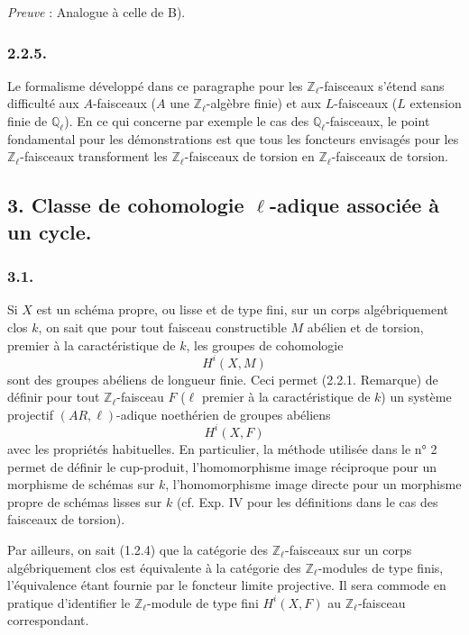 \documentclass[11pt]{article}
\begin{document}
\emph{Preuve} : Analogue à celle de B).

\subsubsection*{2.2.5.}
Le formalisme développé dans ce paragraphe pour les \(\mathbb Z_\ell\)-faisceaux s'étend sans difficulté aux \(A\)-faisceaux (\(A\) une \(\mathbb Z_\ell\)-algèbre finie) et aux \(L\)-faisceaux (\(L\) extension finie de \(\mathbb Q_\ell\)). En ce qui concerne par exemple le cas des \(\mathbb Q_\ell\)-faisceaux, le point fondamental pour les démonstrations est que
tous les foncteurs envisagés pour les \(\mathbb Z_\ell\)-faisceaux transforment les \(\mathbb Z_\ell\)-faisceaux de torsion en \(\mathbb Z_\ell\)-faisceaux de torsion.

\subsection*{3. Classe de cohomologie \(\ell\)-adique associée à un cycle.}

\subsubsection*{3.1.}
Si \(X\) est un schéma propre, ou lisse et de type fini, sur un corps algébriquement clos \(k\), on sait que pour tout faisceau constructible \(M\) abélien et de torsion, premier à la caractéristique de \(k\), les groupes de cohomologie
\[
H^i(X,M)
\]
sont des groupes abéliens de longueur finie. Ceci permet (2.2.1. Remarque) de définir pour tout \(\mathbb Z_\ell\)-faisceau \(F\) (\(\ell\) premier à la caractéristique de \(k\)) un système projectif \((AR,\ell)\)-adique noethérien de groupes abéliens
\[
H^i(X,F)
\]
avec les propriétés habituelles. En particulier, la méthode utilisée dans le n° 2 permet de définir le cup-produit, l'homomorphisme image réciproque pour un morphisme de schémas sur \(k\), l'homomorphisme image directe pour un morphisme propre de schémas lisses sur \(k\) (cf. Exp. IV pour les définitions dans le cas des faisceaux de torsion).

Par ailleurs, on sait (1.2.4) que la catégorie des \(\mathbb Z_\ell\)-faisceaux sur un corps algébriquement clos est équivalente à la catégorie des \(\mathbb Z_\ell\)-modules de type finis, l'équivalence étant fournie par le foncteur limite projective. Il sera commode en pratique d'identifier le \(\mathbb Z_\ell\)-module de type fini \(H^i(X,F)\) au \(\mathbb Z_\ell\)-faisceau correspondant.
\end{document}
